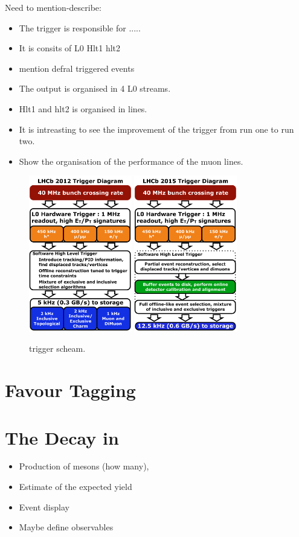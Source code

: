 Need to mention-describe:
\begin{itemize}
  \item The trigger is responsible for .....
  \item It is consits of L0 Hlt1 hlt2
  \item mention defral triggered events
  \item The output is organised in 4 L0 streams.
  \item Hlt1 and hlt2 is organised in lines.
  \item It is intreasting to see the improvement of the trigger from run one to run two.
  \item Show the organisation of the performance of the muon lines.
\end{itemize}

\begin{figure}[t]
  \centering
  \includegraphics[width=0.4\textwidth]{Figures/Chapter2/LHCb_Trigger_RunIAlgDetail_May2015}
  \includegraphics[width=0.4\textwidth]{Figures/Chapter2/LHCb_Trigger_RunII_May2015}
  \caption{\runone trigger scheam.}
  \label{run_one_trigger}
\end{figure}


\section{Favour Tagging}
\label{det_tagging}

\section{The \BJpsiKst Decay in \lhcb}
\label{BspsiKst_at_lhcb}
\begin{itemize}
  \item Production of \Bs mesons (how many),
  \item Estimate of the expected yield
  \item Event display
  \item Maybe define observables
\end{itemize}
